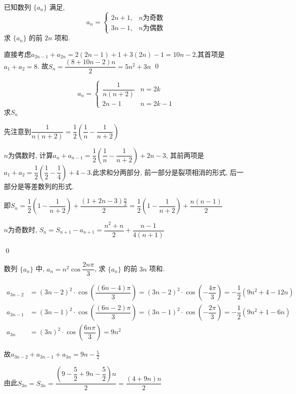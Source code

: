 \begin{example}
    已知数列 \(\{a_n\}\) 满足, 
\[ a_n = 
\begin{cases} 
2n + 1, & n \text{为奇数} \\
3n - 1, & n \text{为偶数}
\end{cases}
\]
求 \(\{a_n\}\) 的前 \(2n\) 项和. 
\end{example}
\begin{jie}
    直接考虑\(a_{2n-1}+a_{2n}=2(2n-1)+1+3(2n)-1=10n-2\),其首项是\(a_1+a_2=8\).
    故\(S_n=\dfrac{(8+10n-2)n}{2}=5n^2+3n\)
    \qed
\end{jie}
\begin{exercise}
    \[
    a_{n}=\left\{
        \begin{array}{ll}
        \dfrac{1}{n(n+2)}& n=2 k \\
        2 n-1&n=2 k-1
        \end{array}\right.
\]
求\(S_{n}\)
\end{exercise}
\begin{jie}先注意到\(\dfrac{1}{n(n+2)}=\dfrac{1}{2}\left(\dfrac{1}{n}-\dfrac{1}{n+2}\right)\)

    \(n\)为偶数时, 计算\(a_{n}+a_{n-1}=\dfrac{1}{2}\left(\dfrac{1}{n}-\dfrac{1}{n+2}\right)+2 n-3 \),
    其前两项是\(a_1+a_2=\dfrac{1}{2}\left(\dfrac{1}{2}-\dfrac{1}{4}\right)+4-3\).此求和分两部分, 前一部分是裂项相消的形式, 后一部分是等差数列的形式. 

    即\(S_n=\dfrac{1}{2}(1-\dfrac{1}{n+2})+\dfrac{(1+2n-3)\frac{n}{2}}{2}=\dfrac{1}{2}(1-\dfrac{1}{n+2})+\dfrac{n(n-1)}{2}\)

    \(n\)为奇数时, \(S_{n}=S_{n+1}-a_{n+1}=\dfrac{n^{2}+n}{2}+\dfrac{n-1}{4(n+1)}\)

    \qed
\end{jie}
\begin{example}
    数列 \(\{a_n\}\) 中, \(a_n = n^2 \cos \dfrac{2n\pi}{3}\), 求 \(\{a_n\}\) 的前 \(3n\) 项和. 
\end{example}
\begin{jie}
    \begin{align*}
        a_{3n-2} & = (3n-2)^2 \cdot \cos\left(\dfrac{(6n-4)\pi}{3}\right) = (3n-2)^2 \cdot \cos\left(-\dfrac{4\pi}{3}\right) = -\dfrac{1}{2}(9n^2 + 4 - 12n) \\
        a_{3n-1} & = (3n-1)^2 \cdot \cos\left(\dfrac{(6n-2)\pi}{3}\right) = (3n-1)^2 \cdot \cos\left(-\dfrac{2\pi}{3}\right) = -\dfrac{1}{2}(9n^2 + 1 - 6n) \\
        a_{3n} & = (3n)^2 \cdot \cos\left(\dfrac{6n\pi}{3}\right) = 9n^2 
    \end{align*}

    故\(a_{3n-2}+a_{3n-1}+a_{3n}=9n - \frac{5}{2}\)

    由此\(S_{3n}=S_{3n}  = \dfrac{\left(9 - \dfrac{5}{2} + 9n - \dfrac{5}{2}\right)n}{2} = \dfrac{(4 + 9n)n}{2}\)
\end{jie}


